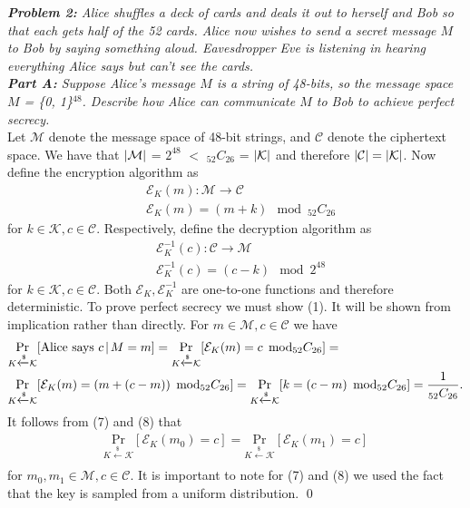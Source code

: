 \documentclass[12pt]{article}
\DeclarePairedDelimiter \abs{\lvert}{\rvert}%
\theoremstyle{remark}
\begin{document}
\newpage

\textit{\textbf{Problem 2:} Alice shuffles a deck of cards and deals it out to herself and Bob so that each gets half of the 52 cards. Alice now wishes to send a secret message $M$ to Bob by saying something aloud. Eavesdropper Eve is listening in hearing everything Alice says but can’t see the cards.} \\

\textit{\textbf{Part A:} Suppose Alice's message $M$ is a string of 48-bits, so the message space $M$ = \{0, 1\}$^{48}$. Describe how Alice can communicate $M$ to Bob to achieve perfect secrecy.} \\

Let $\mathcal{M}$ denote the message space of 48-bit strings, and $\mathcal{C}$ denote the ciphertext space. We have that $\abs{\mathcal{M}}$ = $2^{48}$ $<$ ${}_{52}C_{26}$ = $\abs{\mathcal{K}}$ and therefore $\abs{\mathcal{C}} = \abs{\mathcal{K}}$. Now define the encryption algorithm as 
\begin{align}
	& \mathcal{E}_K(m): \mathcal{M} \rightarrow \mathcal{C} \\
	& \mathcal{E}_K(m) = (m + k) \mod {}_{52}C_{26}
\end{align}
for $k \in \mathcal{K}, c \in \mathcal{C}$. Respectively, define the decryption algorithm as
\begin{align}
	& \mathcal{E}^{-1}_K(c): \mathcal{C} \rightarrow \mathcal{M} \\
	& \mathcal{E}^{-1}_K(c) = (c - k) \mod 2^{48}
\end{align}
for $k \in \mathcal{K}, c \in \mathcal{C}$. Both $\mathcal{E}_K, \mathcal{E}^{-1}_K$ are one-to-one functions and therefore deterministic. To prove perfect secrecy we must show (1). It will be shown from implication rather than directly. For $m \in \mathcal{M}, c \in \mathcal{C}$ we have 
\begin{align}
		& \underset{K \xleftarrow[]{\$} \mathcal{K}}{\text{Pr}}[\text{Alice says } c \hspace{0.05cm} \vert \hspace{0.05cm} M = m] =
		\underset{K \xleftarrow[]{\$} \mathcal{K}}{\text{Pr}}[\mathcal{E}_K(m) = c \text{ \hspace{.05cm}mod} {}_{52}C_{26}] =
		\\
		& \underset{K \xleftarrow[]{\$} \mathcal{K}}{\text{Pr}}[\mathcal{E}_K(m) = (m + (c - m)) \text{ \hspace{.05cm}mod} {}_{52}C_{26}]
		= \underset{K \xleftarrow[]{\$} \mathcal{K}}{\text{Pr}}[k = (c - m) \text{ \hspace{.05cm}mod} {}_{52}C_{26}] = \frac{1}{{}_{52}C_{26}}.
\end{align}
It follows from (7) and (8) that 
\begin{align}
	\underset{K \xleftarrow[]{\$} \mathcal{K}}{\text{Pr}}[\mathcal{E}_K(m_0) = c] = 
	\underset{K \xleftarrow[]{\$} \mathcal{K}}{\text{Pr}}[\mathcal{E}_K(m_1) = c]
\end{align}
for $m_0, m_1 \in \mathcal{M}, c \in \mathcal{C}$. It is important to note for (7) and (8) we used the fact that the key is sampled from a uniform distribution. \qed \\
\end{document}
